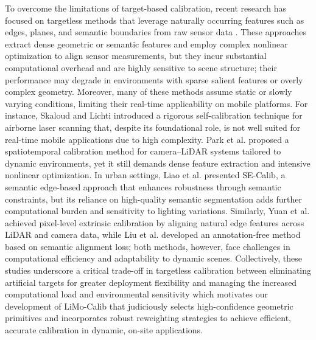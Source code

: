 To overcome the limitations of target-based calibration, recent research has focused on targetless methods that leverage naturally occurring features such as edges, planes, and semantic boundaries from raw sensor data \cite{skaloud2006rigorous,park2020,liao2023se}. These approaches extract dense geometric or semantic features and employ complex nonlinear optimization to align sensor measurements, but they incur substantial computational overhead and are highly sensitive to scene structure; their performance may degrade in environments with sparse salient features or overly complex geometry. Moreover, many of these methods assume static or slowly varying conditions, limiting their real-time applicability on mobile platforms. For instance, Skaloud and Lichti \cite{skaloud2006rigorous} introduced a rigorous self-calibration technique for airborne laser scanning that, despite its foundational role, is not well suited for real-time mobile applications due to high complexity. Park et al. \cite{park2020} proposed a spatiotemporal calibration method for camera–LiDAR systems tailored to dynamic environments, yet it still demands dense feature extraction and intensive nonlinear optimization. In urban settings, Liao et al. \cite{liao2023se} presented SE-Calib, a semantic edge-based approach that enhances robustness through semantic constraints, but its reliance on high-quality semantic segmentation adds further computational burden and sensitivity to lighting variations. Similarly, Yuan et al. \cite{yuan2021} achieved pixel-level extrinsic calibration by aligning natural edge features across LiDAR and camera data, while Liu et al. \cite{liu2021} developed an annotation-free method based on semantic alignment loss; both methods, however, face challenges in computational efficiency and adaptability to dynamic scenes. Collectively, these studies underscore a critical trade-off in targetless calibration between eliminating artificial targets for greater deployment flexibility and managing the increased computational load and environmental sensitivity which motivates our development of LiMo-Calib that judiciously selects high-confidence geometric primitives and incorporates robust reweighting strategies to achieve efficient, accurate calibration in dynamic, on-site applications.

